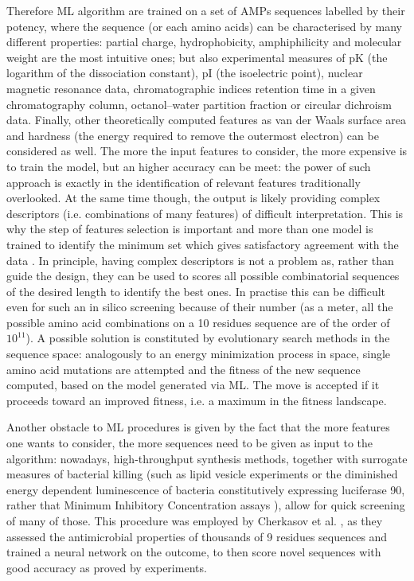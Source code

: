 Therefore ML algorithm are trained on a set of AMPs sequences labelled by their potency, where the sequence (or each amino acids) can be characterised by many different properties: partial charge, hydrophobicity, amphiphilicity and molecular weight are the most intuitive ones; but also experimental measures of pK (the logarithm of the dissociation constant), pI (the isoelectric point), nuclear magnetic resonance data, chromatographic indices retention time in a given chromatography column, octanol–water partition fraction or circular dichroism data. Finally, other theoretically computed features as van der Waals surface area and hardness (the energy required to remove the outermost electron) can be considered as well.
%
The more the input features to consider, the more expensive is to train the model, but an higher accuracy can be meet: the power of such approach is exactly in the identification of relevant features traditionally overlooked. At the same time though, the output is likely providing complex descriptors (i.e. combinations of many features) of difficult interpretation. This is why the step of features selection is important and more than one model is trained to identify the minimum set which gives satisfactory agreement with the data \cite{Walters2005,Gonzalez2008}.
%
In principle, having complex descriptors is not a problem as, rather than guide the design, they can be used to scores all possible combinatorial sequences of the desired length to identify the best ones. In practise this can be difficult even for such an in silico screening because of their number (as a meter, all the possible amino acid combinations on a 10 residues sequence are of the order of $10^{11}$).
%
A possible solution is constituted by evolutionary search methods in the sequence space: analogously to an energy minimization process in space, single amino acid mutations are attempted and the fitness of the new sequence computed, based on the model generated via ML. The move is accepted if it proceeds toward an improved fitness, i.e. a maximum in the fitness landscape.

Another obstacle to ML procedures is given by the fact that the more features one wants to consider, the more sequences need to be given as input to the algorithm: nowadays, high-throughput synthesis methods, together with surrogate measures of bacterial killing (such as lipid vesicle experiments \cite{Wimley2010} or the diminished energy ­dependent luminescence of bacteria constitutively expressing luciferase 90, rather that Minimum Inhibitory Concentration assays \cite{Lewenza2005}), allow for quick screening of many of those.
%
This procedure was employed by Cherkasov et al. \cite{Cherkasov2009}, as they assessed the antimicrobial properties of thousands of 9 residues sequences and trained a neural network on the outcome, to then score novel sequences with good accuracy as proved by experiments.

